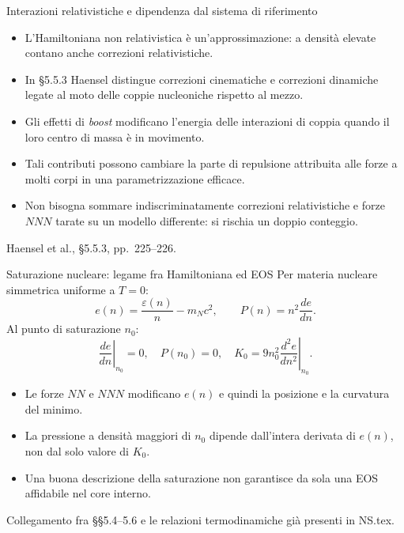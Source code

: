 \begin{frame}[t]{Interazioni relativistiche e dipendenza dal sistema di riferimento}
\small
\begin{itemize}
\item L'Hamiltoniana non relativistica è un'approssimazione: a densità elevate contano anche correzioni relativistiche.
\item In §5.5.3 Haensel distingue correzioni cinematiche e correzioni dinamiche legate al moto delle coppie nucleoniche rispetto al mezzo.
\item Gli effetti di \emph{boost} modificano l'energia delle interazioni di coppia quando il loro centro di massa è in movimento.
\item Tali contributi possono cambiare la parte di repulsione attribuita alle forze a molti corpi in una parametrizzazione efficace.
\item Non bisogna sommare indiscriminatamente correzioni relativistiche e forze $NNN$ tarate su un modello differente: si rischia un doppio conteggio.
\end{itemize}
{\footnotesize Haensel et al., §5.5.3, pp.~225--226.}
\end{frame}

\begin{frame}[t]{Saturazione nucleare: legame fra Hamiltoniana ed EOS}
\small
Per materia nucleare simmetrica uniforme a $T=0$:
\[
e(n)=\frac{\varepsilon(n)}{n}-m_Nc^2,\qquad
P(n)=n^2\frac{de}{dn}.
\]
Al punto di saturazione $n_0$:
\[
\left.\frac{de}{dn}\right|_{n_0}=0,\quad P(n_0)=0,\quad
K_0=9n_0^2\left.\frac{d^2e}{dn^2}\right|_{n_0}.
\]
\begin{itemize}
\item Le forze $NN$ e $NNN$ modificano $e(n)$ e quindi la posizione e la curvatura del minimo.
\item La pressione a densità maggiori di $n_0$ dipende dall'intera derivata di $e(n)$, non dal solo valore di $K_0$.
\item Una buona descrizione della saturazione non garantisce da sola una EOS affidabile nel core interno.
\end{itemize}
{\footnotesize Collegamento fra §§5.4--5.6 e le relazioni termodinamiche già presenti in NS.tex.}
\end{frame}

